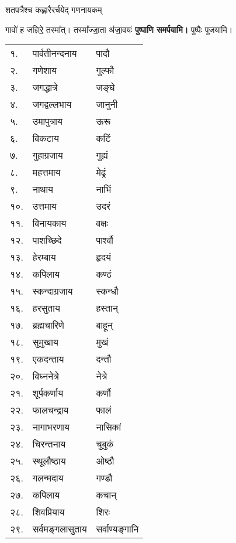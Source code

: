 \begin{center}
{शतपत्रैश्च कह्लारैरर्चयेद् गणनायकम्}

{गावो॑ ह जज्ञिरे॒ तस्मा᳚त्। तस्मा᳚ज्जा॒ता अ॑जा॒वयः॑}
\textbf{\devAya{} पुष्पाणि समर्पयामि।} पुष्पैः पूजयामि।

\begin{longtable}{ll@{~नमः — }l@{~पूजयामि}}
    १. & पार्वतीनन्दनाय & पादौ\\
    २. & गणेशाय & गुल्फौ\\
    ३. & जगद्धात्रे & जङ्घे\\
    ४. & जगद्वल्लभाय & जानुनी\\
    ५. & उमापुत्राय & ऊरू\\
    ६. & विकटाय & कटिं\\
    ७. & गुहाग्रजाय & गुह्यं\\
    ८. & महत्तमाय & मेढ्रं\\
    ९. & नाथाय & नाभिं\\
    १०. & उत्तमाय & उदरं\\
    ११. & विनायकाय & वक्षः\\
    १२. & पाशच्छिदे & पार्श्वौ\\
    १३. & हेरम्बाय & हृदयं\\
    १४. & कपिलाय & कण्ठं\\
    १५. & स्कन्दाग्रजाय & स्कन्धौ\\
    १६. & हरसुताय & हस्तान्\\
    १७. & ब्रह्मचारिणे & बाहून्\\
    १८. & सुमुखाय & मुखं\\
    १९. & एकदन्ताय & दन्तौ\\
    २०. & विघ्ननेत्रे & नेत्रे\\
    २१. & शूर्पकर्णाय & कर्णौ\\
    २२. & फालचन्द्राय & फालं\\
    २३. & नागाभरणाय & नासिकां\\
    २४. & चिरन्तनाय & चुबुकं\\
    २५. & स्थूलौष्ठाय & ओष्ठौ\\
    २६. & गलन्मदाय & गण्डौ\\
    २७. & कपिलाय & कचान्\\
    २८. & शिवप्रियाय & शिरः\\
    २९. & सर्वमङ्गलासुताय & सर्वाण्यङ्गानि\\
\end{longtable}



\end{center}
